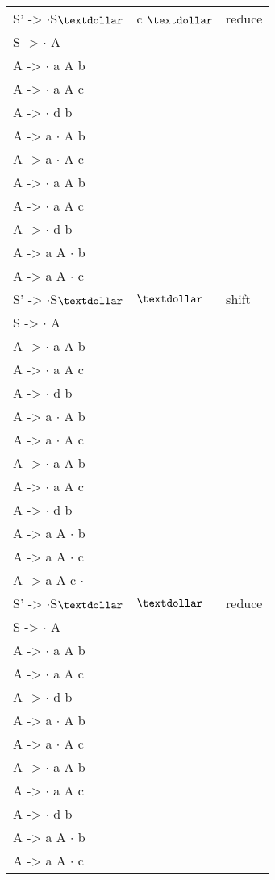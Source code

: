 \begin{latin}
\begin{tabular}{ | m{5cm} | m{5cm} | m{5cm} |  } \hline
S' -> {$\cdot$}S{$\textdollar$} & c {$\textdollar$} & reduce  \\ 
S -> {$\cdot$} A & & \\ 
A -> {$\cdot$} a A b & & \\
A -> {$\cdot$} a A c & & \\
A -> {$\cdot$} d b & & \\
A -> a {$\cdot$} A b & &\\ 
A -> a {$\cdot$} A c & & \\ 
A -> {$\cdot$} a A b & & \\
A -> {$\cdot$} a A c & & \\
A -> {$\cdot$} d b & & \\
A -> a A {$\cdot$} b & & \\
A -> a A {$\cdot$} c & & \\ \hline

S' -> {$\cdot$}S{$\textdollar$} & {$\textdollar$} & shift \\ 
S -> {$\cdot$} A & & \\ 
A -> {$\cdot$} a A b & & \\
A -> {$\cdot$} a A c & & \\
A -> {$\cdot$} d b & & \\
A -> a {$\cdot$} A b & &\\ 
A -> a {$\cdot$} A c & & \\ 
A -> {$\cdot$} a A b & & \\
A -> {$\cdot$} a A c & & \\
A -> {$\cdot$} d b & & \\
A -> a A {$\cdot$} b & & \\
A -> a A {$\cdot$} c & & \\
A -> a A c {$\cdot$}  & & \\ \hline

S' -> {$\cdot$}S{$\textdollar$} & {$\textdollar$} & reduce \\ 
S -> {$\cdot$} A & & \\ 
A -> {$\cdot$} a A b & & \\
A -> {$\cdot$} a A c & & \\
A -> {$\cdot$} d b & & \\
A -> a {$\cdot$} A b & &\\ 
A -> a {$\cdot$} A c & & \\ 
A -> {$\cdot$} a A b & & \\
A -> {$\cdot$} a A c & & \\
A -> {$\cdot$} d b & & \\
A -> a A {$\cdot$} b & & \\
A -> a A {$\cdot$} c & & \\\hline
\end{tabular}
\end{latin}